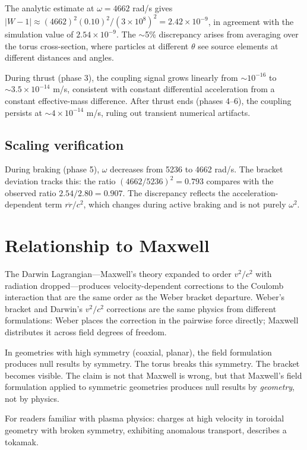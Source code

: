\documentclass[12pt,preprint,amsmath,amssymb]{revtex4-2}
\begin{document}
The analytic estimate at $\omega = 4662$ rad/s gives
$|W - 1| \approx (4662)^2(0.10)^2 / (3 \times 10^8)^2 = 2.42 \times 10^{-9}$,
in agreement with the simulation value of $2.54 \times 10^{-9}$.
The $\sim$5\% discrepancy arises from averaging over the torus cross-section,
where particles at different $\theta$ see source elements at different distances
and angles.

During thrust (phase 3), the coupling signal grows linearly from
$\sim\!10^{-16}$ to $\sim\!3.5 \times 10^{-14}$ m/s, consistent with constant
differential acceleration from a constant effective-mass difference.
After thrust ends (phases 4--6), the coupling persists at
$\sim\!4 \times 10^{-14}$ m/s, ruling out transient numerical artifacts.

\subsection{Scaling verification}

During braking (phase 5), $\omega$ decreases from 5236 to 4662 rad/s.
The bracket deviation tracks this: the ratio
$(4662/5236)^2 = 0.793$ compares with the observed ratio $2.54/2.80 = 0.907$.
The discrepancy reflects the acceleration-dependent term $r\ddot{r}/c^2$,
which changes during active braking and is not purely $\omega^2$.

\section{Relationship to Maxwell}
\label{sec:maxwell}

The Darwin Lagrangian---Maxwell's theory expanded to order $v^2/c^2$ with radiation
dropped---produces velocity-dependent corrections to the Coulomb interaction that
are the same order as the Weber bracket departure.
Weber's bracket and Darwin's $v^2/c^2$ corrections are the same physics from
different formulations: Weber places the correction in the pairwise force directly;
Maxwell distributes it across field degrees of freedom.

In geometries with high symmetry (coaxial, planar), the field formulation produces
null results by symmetry. The torus breaks this symmetry. The bracket becomes visible.
The claim is not that Maxwell is wrong, but that Maxwell's field formulation applied
to symmetric geometries produces null results by \emph{geometry}, not by physics.

For readers familiar with plasma physics: charges at high velocity in toroidal
geometry with broken symmetry, exhibiting anomalous transport, describes a tokamak.
\end{document}
